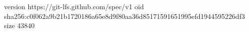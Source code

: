 version https://git-lfs.github.com/spec/v1
oid sha256:c0f062a9b21b1720186a65e8d9f80aa36d85171591651995efd1944595226df3
size 43840
